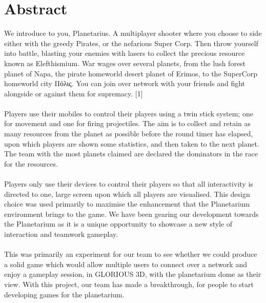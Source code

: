 \documentclass[11pt,a4paper]{article}
\begin{document}
\pagebreak
\tableofcontents

\pagebreak

\section{Abstract}

We introduce to you, Planetarius. A multiplayer shooter where you choose to side either with the greedy Pirates, or the nefarious Super Corp. Then throw yourself into battle, blasting your enemies with lasers to collect the precious resource known as Elefthismium. War wages over several planets, from the lush forest planet of Napa, the pirate homeworld desert planet of Erimos, to the SuperCorp homeworld city Πόλις. You can join over network with your friends and fight alongside or against them for supremacy. [1] \\ \\
Players use their mobiles to control their players using a twin stick system; one for movement and one for firing projectiles. The aim is to collect and retain as many resources from the planet as possible before the round timer has elapsed, upon which players are shown some statistics, and then taken to the next planet. The team with the most planets claimed are declared the dominators in the race for the resources. \\ \\
Players only use their devices to control their players so that all interactivity is directed to one, large screen upon which all players are visualised. This design choice was used primarily to maximise the enhancement that the Planetarium environment brings to the game. We have been gearing our development towards the Planetarium as it is a unique opportunity to showcase a new style of interaction and teamwork gameplay. \\ \\
This was primarily an experiment for our team to see whether we could produce a solid game which would allow multiple users to connect over a network and enjoy a gameplay session, in GLORIOUS 3D, with the planetarium dome as their view. With this project, our team has made a breakthrough, for people to start developing games for the planetarium.






\pagebreak
\end{document}
